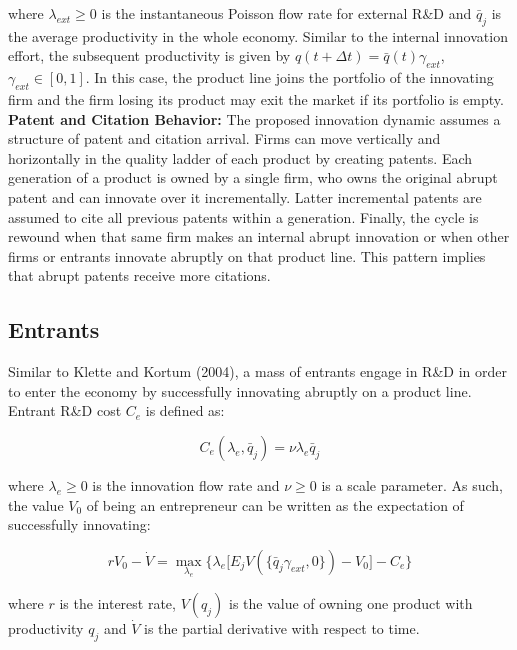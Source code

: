 \documentclass[letterpaper,12pt]{article}
\theoremstyle{definition}
\begin{document}
\noindent where $\lambda_{ext} \ge 0$ is the instantaneous Poisson flow rate for external R\&D and $\bar{q}_j$ is the average productivity in the whole economy. Similar to the internal innovation effort, the subsequent productivity is given by $q(t + \Delta t) = \bar{q}(t)\gamma_{ext}$, $\gamma_{ext} \in [0,1]$. In this case, the product line joins the portfolio of the innovating firm and the firm losing its product may exit the market if its portfolio is empty.\\

\textbf{Patent and Citation Behavior:} The proposed innovation dynamic assumes a structure of patent and citation arrival. Firms can move vertically and horizontally in the quality ladder of each product by creating patents. Each generation of a product is owned by a single firm, who owns the original abrupt patent and can innovate over it incrementally. Latter incremental patents are assumed to cite all previous patents within a generation. Finally, the cycle is rewound when that same firm makes an internal abrupt innovation or when other firms or entrants innovate abruptly on that product line. This pattern implies that abrupt patents receive more citations.

\subsection{Entrants}

Similar to Klette and Kortum (2004), a mass of entrants engage in R\&D in order to enter the economy by successfully innovating abruptly on a product line. Entrant R\&D cost $C_e$ is defined as:

\begin{equation} \label{eq:Ce}
C_e(\lambda_e,\bar{q}_j) = \nu\lambda_e\bar{q}_j
\end{equation}

\noindent where $\lambda_e \ge 0$ is the innovation flow rate and $\nu \ge 0$ is a scale parameter. As such, the value $V_0$ of being an entrepreneur can be written as the expectation of successfully innovating:

\begin{equation} \label{eq:V0}
rV_0 - \dot{V} = \max\limits_{\lambda_e}\big\{\lambda_e\big[E_jV(\{\bar{q}_j\gamma_{ext},0\}) - V_0\big] - C_e\big\}
\end{equation}

\noindent where $r$ is the interest rate, $V(q_j)$ is the value of owning one product with productivity $q_j$ and $\dot{V}$ is the partial derivative with respect to time.
\end{document}
